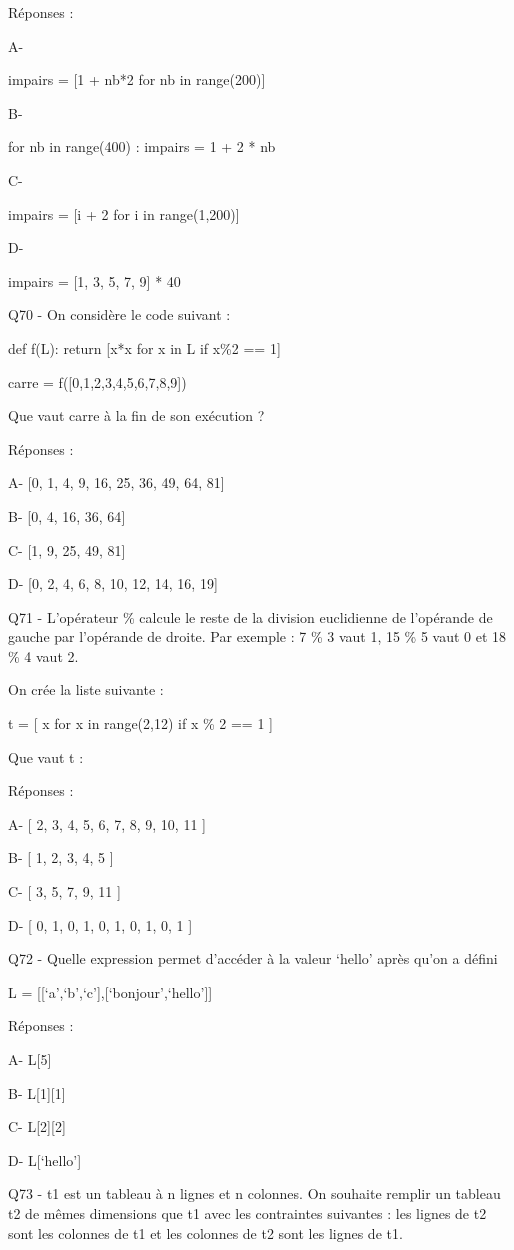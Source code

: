 \documentclass[
]{book}
\begin{document}
Réponses :

A-

impairs = {[}1 + nb*2 for nb in range(200){]}

B-

for nb in range(400) :
impairs = 1 + 2 * nb

C-

impairs = {[}i + 2 for i in range(1,200){]}

D-

impairs = {[}1, 3, 5, 7, 9{]} * 40

Q70 - On considère le code suivant :

def f(L):
return {[}x*x for x in L if x\%2 == 1{]}

carre = f({[}0,1,2,3,4,5,6,7,8,9{]})

Que vaut carre à la fin de son exécution ?

Réponses :

A- {[}0, 1, 4, 9, 16, 25, 36, 49, 64, 81{]}

B- {[}0, 4, 16, 36, 64{]}

C- {[}1, 9, 25, 49, 81{]}

D- {[}0, 2, 4, 6, 8, 10, 12, 14, 16, 19{]}

Q71 - L'opérateur \% calcule le reste de la division euclidienne de l'opérande de gauche par l'opérande de droite. Par exemple : 7 \% 3 vaut 1, 15 \% 5 vaut 0 et 18 \% 4 vaut 2.

On crée la liste suivante :

t = {[} x for x in range(2,12) if x \% 2 == 1 {]}

Que vaut t :

Réponses :

A- {[} 2, 3, 4, 5, 6, 7, 8, 9, 10, 11 {]}

B- {[} 1, 2, 3, 4, 5 {]}

C- {[} 3, 5, 7, 9, 11 {]}

D- {[} 0, 1, 0, 1, 0, 1, 0, 1, 0, 1 {]}

Q72 - Quelle expression permet d'accéder à la valeur `hello' après qu'on a défini

L = {[}{[}`a',`b',`c'{]},{[}`bonjour',`hello'{]}{]}

Réponses :

A- L{[}5{]}

B- L{[}1{]}{[}1{]}

C- L{[}2{]}{[}2{]}

D- L{[}`hello'{]}

Q73 - t1 est un tableau à n lignes et n colonnes. On souhaite remplir un tableau t2 de mêmes dimensions que t1 avec les contraintes suivantes : les lignes de t2 sont les colonnes de t1 et les colonnes de t2 sont les lignes de t1.
\end{document}
